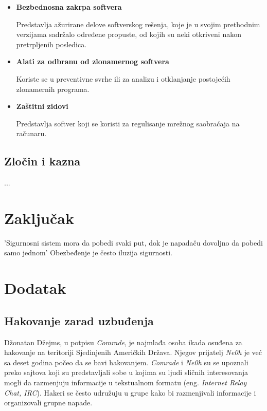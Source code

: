 \documentclass[a4paper]{article}
\begin{document}
\begin{itemize}
\item \textbf{Bezbednosna zakrpa softvera}

Predstavlja ažurirane delove softverskog rešenja, koje je u svojim prethodnim verzijama sadržalo određene propuste, od kojih su neki otkriveni nakon pretrpljenih posledica.

\item \textbf{Alati za odbranu od zlonamernog softvera}

Koriste se u preventivne svrhe ili za analizu i otklanjanje postojećih zlonamernih programa.

\item \textbf{Zaštitni zidovi}

Predstavlja softver koji se koristi za regulisanje mrežnog saobraćaja na računaru.

\end{itemize}

\subsection{Zločin i kazna}

...


\section{Zaključak}
\label{sec:zakljucak}

'Sigurnosni sistem mora da pobedi svaki put, dok je napadaču dovoljno da pobedi samo jednom' \cite{intrusion}
Obezbeđenje je često iluzija sigurnosti. \cite{deception}

\appendix
 


\appendix
\section{Dodatak}

\subsection{Hakovanje zarad uzbuđenja}
\label{mladi_hakeri}

Džonatan Džejms, u potpisu \textit{Comrade}, je najmlađa osoba ikada osuđena za hakovanje na teritoriji Sjedinjenih Američkih Država. Njegov prijatelj \textit{Ne0h} je već sa deset godina počeo da se bavi hakovanjem.  \textit{Comrade} i \textit{Ne0h} su se upoznali preko sajtova koji su predstavljali sobe u kojima su ljudi sličnih interesovanja mogli da razmenjuju informacije u tekstualnom formatu (eng. \textit{Internet Relay Chat, IRC}). Hakeri se često udružuju u grupe kako bi razmenjivali informacije i organizovali grupne napade.
\end{document}
